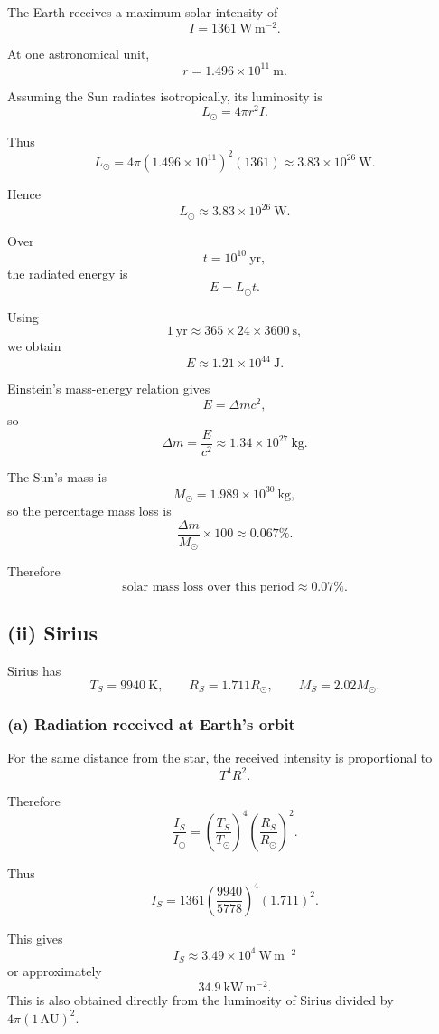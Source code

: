 \documentclass[11pt,a4paper]{article}
\begin{document}
The Earth receives a maximum solar intensity of
\[
I=1361\ \mathrm{W\,m^{-2}}.
\]

At one astronomical unit,
\[
r=1.496\times10^{11}\ \mathrm m.
\]

Assuming the Sun radiates isotropically, its luminosity is
\[
L_\odot=4\pi r^2I.
\]

Thus
\[
L_\odot
=
4\pi(1.496\times10^{11})^2(1361)
\approx3.83\times10^{26}\ \mathrm W.
\]

Hence
\[
\boxed{L_\odot\approx3.83\times10^{26}\ \mathrm W}.
\]

Over
\[
t=10^{10}\ \mathrm{yr},
\]
the radiated energy is
\[
E=L_\odot t.
\]

Using
\[
1\ \mathrm{yr}\approx365\times24\times3600\ \mathrm s,
\]
we obtain
\[
E\approx1.21\times10^{44}\ \mathrm J.
\]

Einstein's mass-energy relation gives
\[
E=\Delta mc^2,
\]
so
\[
\Delta m
=
\frac{E}{c^2}
\approx1.34\times10^{27}\ \mathrm{kg}.
\]

The Sun's mass is
\[
M_\odot=1.989\times10^{30}\ \mathrm{kg},
\]
so the percentage mass loss is
\[
\frac{\Delta m}{M_\odot}\times100
\approx0.067\%.
\]

Therefore
\[
\boxed{\text{solar mass loss over this period}\approx0.07\%}.
\]

\subsection{(ii) Sirius}

Sirius has
\[
T_S=9940\ \mathrm K,
\qquad
R_S=1.711R_\odot,
\qquad
M_S=2.02M_\odot.
\]

\subsubsection*{(a) Radiation received at Earth's orbit}

For the same distance from the star, the received intensity is proportional to
\[
T^4R^2.
\]

Therefore
\[
\frac{I_S}{I_\odot}
=
\left(\frac{T_S}{T_\odot}\right)^4
\left(\frac{R_S}{R_\odot}\right)^2.
\]

Thus
\[
I_S
=
1361
\left(\frac{9940}{5778}\right)^4
(1.711)^2.
\]

This gives
\[
\boxed{I_S\approx3.49\times10^4\ \mathrm{W\,m^{-2}}}
\]
or approximately
\[
\boxed{34.9\ \mathrm{kW\,m^{-2}}}.
\]
This is also obtained directly from the luminosity of Sirius divided by
$4\pi(1\,\mathrm{AU})^2$.
\end{document}
